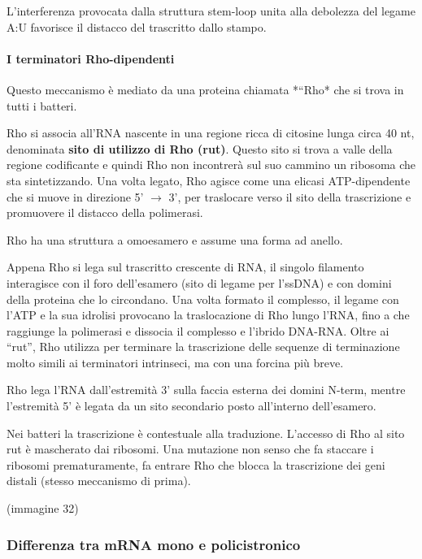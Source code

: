 \documentclass[]{article}
\begin{document}
L'interferenza provocata dalla struttura stem-loop unita alla debolezza
del legame A:U favorisce il distacco del trascritto dallo stampo.

\paragraph{I terminatori
Rho-dipendenti}\label{i-terminatori-rho-dipendenti}

Questo meccanismo è mediato da una proteina chiamata *``Rho* che si
trova in tutti i batteri.

Rho si associa all'RNA nascente in una regione ricca di citosine lunga
circa 40 nt, denominata \textbf{sito di utilizzo di Rho (rut)}. Questo
sito si trova a valle della regione codificante e quindi Rho non
incontrerà sul suo cammino un ribosoma che sta sintetizzando. Una volta
legato, Rho agisce come una elicasi ATP-dipendente che si muove in
direzione 5' \(\rightarrow\) 3', per traslocare verso il sito della
trascrizione e promuovere il distacco della polimerasi.

Rho ha una struttura a omoesamero e assume una forma ad anello.

Appena Rho si lega sul trascritto crescente di RNA, il singolo filamento
interagisce con il foro dell'esamero (sito di legame per l'ssDNA) e con
domini della proteina che lo circondano. Una volta formato il complesso,
il legame con l'ATP e la sua idrolisi provocano la traslocazione di Rho
lungo l'RNA, fino a che raggiunge la polimerasi e dissocia il complesso
e l'ibrido DNA-RNA. Oltre ai ``rut'', Rho utilizza per terminare la
trascrizione delle sequenze di terminazione molto simili ai terminatori
intrinseci, ma con una forcina più breve.

Rho lega l'RNA dall'estremità 3' sulla faccia esterna dei domini N-term,
mentre l'estremità 5' è legata da un sito secondario posto all'interno
dell'esamero.

Nei batteri la trascrizione è contestuale alla traduzione. L'accesso di
Rho al sito rut è mascherato dai ribosomi. Una mutazione non senso che
fa staccare i ribosomi prematuramente, fa entrare Rho che blocca la
trascrizione dei geni distali (stesso meccanismo di prima).

(immagine 32)

\subsubsection{Differenza tra mRNA mono e
policistronico}\label{differenza-tra-mrna-mono-e-policistronico}
\end{document}
